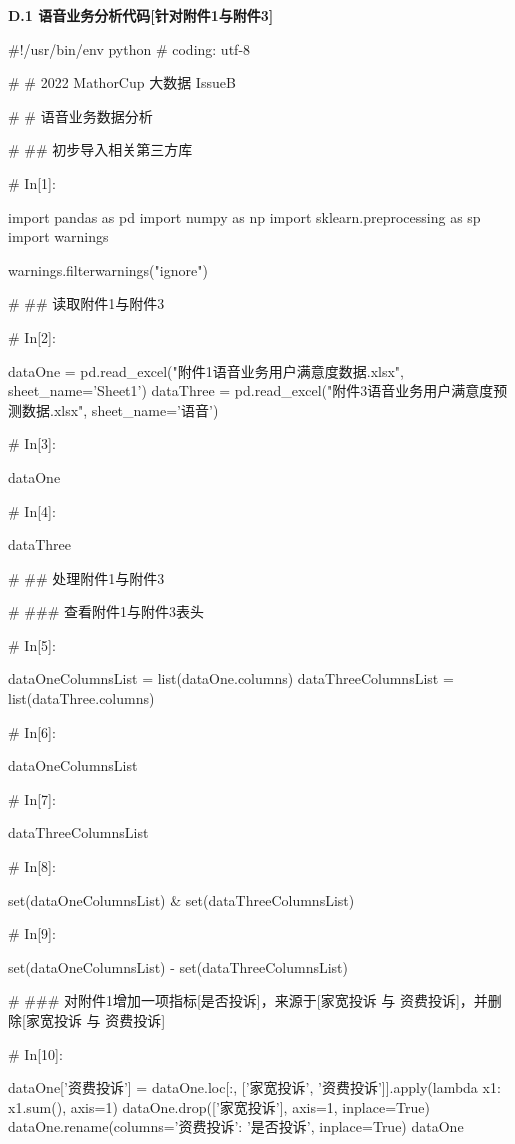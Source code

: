 \documentclass{MathorCupmodeling}
\begin{document}
\textbf{D.1 语音业务分析代码[针对附件1与附件3]}
\begin{python}
	#!/usr/bin/env python
	# coding: utf-8
	
	# # 2022 MathorCup 大数据 IssueB
	
	# # 语音业务数据分析
	
	# ## 初步导入相关第三方库
	
	# In[1]:
	
	
	import pandas as pd
	import numpy as np
	import sklearn.preprocessing as sp
	import warnings
	
	warnings.filterwarnings("ignore")
	
	# ## 读取附件1与附件3
	
	# In[2]:
	
	
	dataOne = pd.read_excel("附件1语音业务用户满意度数据.xlsx", sheet_name='Sheet1')
	dataThree = pd.read_excel("附件3语音业务用户满意度预测数据.xlsx", sheet_name='语音')
	
	# In[3]:
	
	
	dataOne
	
	# In[4]:
	
	
	dataThree
	
	# ## 处理附件1与附件3
	
	# ### 查看附件1与附件3表头
	
	# In[5]:
	
	
	dataOneColumnsList = list(dataOne.columns)
	dataThreeColumnsList = list(dataThree.columns)
	
	# In[6]:
	
	
	dataOneColumnsList
	
	# In[7]:
	
	
	dataThreeColumnsList
	
	# In[8]:
	
	
	set(dataOneColumnsList) & set(dataThreeColumnsList)
	
	# In[9]:
	
	
	set(dataOneColumnsList) - set(dataThreeColumnsList)
	
	# ### 对附件1增加一项指标[是否投诉]，来源于[家宽投诉 与 资费投诉]，并删除[家宽投诉 与 资费投诉]
	
	# In[10]:
	
	
	dataOne['资费投诉'] = dataOne.loc[:, ['家宽投诉', '资费投诉']].apply(lambda x1: x1.sum(), axis=1)
	dataOne.drop(['家宽投诉'], axis=1, inplace=True)
	dataOne.rename(columns={'资费投诉': '是否投诉'}, inplace=True)
	dataOne
	

\end{python}
\end{document}
